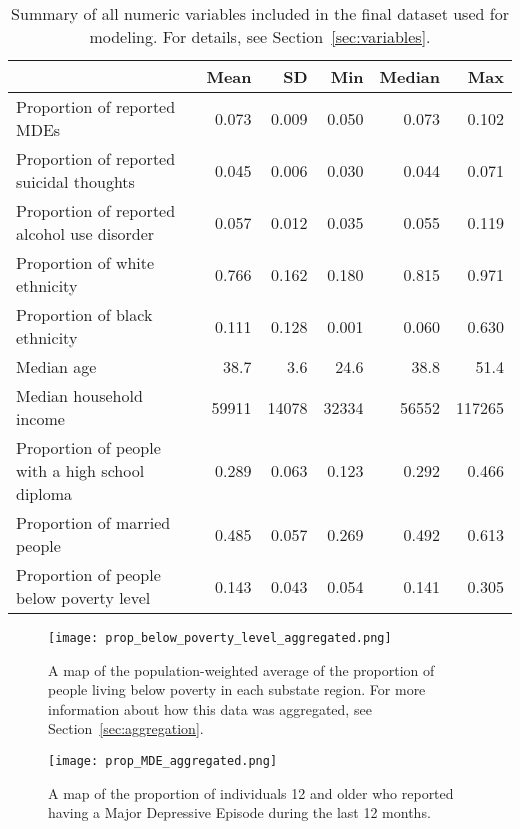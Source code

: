 \documentclass{article}
\begin{document}
\begin{table}[t]
\begin{center}
\begin{tabular}{l r r r r r}
    \toprule
    & Mean & SD & Min & Median & Max\\
    \midrule
    Proportion of reported MDEs & 0.073 & 0.009 & 0.050 & 0.073 & 0.102\\
    Proportion of reported suicidal thoughts & 0.045 & 0.006 & 0.030 & 0.044 & 0.071\\
    Proportion of reported alcohol use disorder & 0.057 & 0.012 & 0.035 & 0.055 & 0.119\\
    Proportion of white ethnicity & 0.766 & 0.162 & 0.180 & 0.815 & 0.971\\
    Proportion of black ethnicity & 0.111 & 0.128 & 0.001 & 0.060 & 0.630\\
    Median age & 38.7 & 3.6 & 24.6 & 38.8 & 51.4\\
    Median household income & 59911 & 14078 & 32334 & 56552 & 117265\\
    Proportion of people with a high school diploma & 0.289 & 0.063 & 0.123 & 0.292 & 0.466\\
    Proportion of married people & 0.485 & 0.057 & 0.269 & 0.492 & 0.613\\
    Proportion of people below poverty level & 0.143 & 0.043 & 0.054 & 0.141 & 0.305\\
    \bottomrule
\end{tabular}
\end{center}
\caption{\label{tab:summary}
Summary of
all numeric variables included in the final dataset used for modeling.
For details, see Section~\ref{sec:variables}.}
\end{table}

\begin{figure}[!htb]
    \centering
    \texttt{[image: prop\_below\_poverty\_level\_aggregated.png]}
    \caption{\label{fig:map-poverty}A map of the population-weighted average of the proportion of
    people living below poverty in each substate region.
	For more information about how this data was aggregated,
	see Section~\ref{sec:aggregation}.
	}
\end{figure}

\begin{figure}[!htb]
    \centering
    \texttt{[image: prop\_MDE\_aggregated.png]}
    \caption{\label{fig:map-MDE}
    A map of the proportion of individuals 12 and older who
	reported having a Major Depressive Episode during the last 12 months.}
\end{figure}
\end{document}
